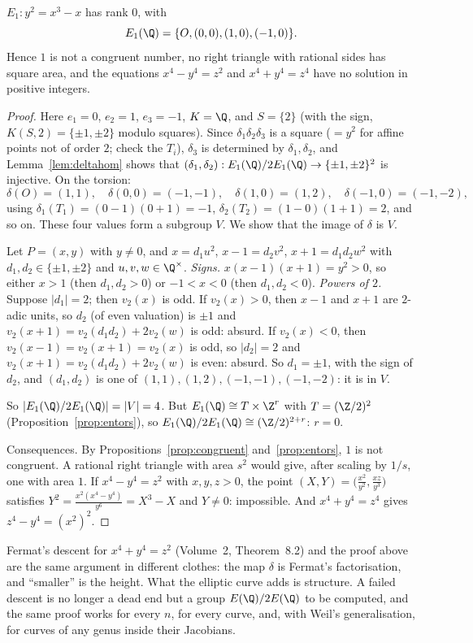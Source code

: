 \begin{theorem}[Fermat]\label{thm:onecongruent}
$E_1:y^2=x^3-x$ has rank $0$, with
\[
E_1(\Q)=\{O,(0,0),(1,0),(-1,0)\}.
\]
Hence $1$ is not a congruent number, no right triangle with rational sides has square area, and
the equations $x^4-y^4=z^2$ and $x^4+y^4=z^4$ have no solution in positive integers.
\end{theorem}
\begin{proof}
Here $e_1=0$, $e_2=1$, $e_3=-1$, $K=\Q$, and $S=\{2\}$ (with the sign, $K(S,2)=\{\pm1,\pm2\}$ modulo squares). Since $\delta_1\delta_2\delta_3$ is a square
($=y^2$ for affine points not of order $2$; check the $T_i$), $\delta_3$ is determined by $\delta_1,\delta_2$, and Lemma~\ref{lem:deltahom} shows that
$(\delta_1,\delta_2):E_1(\Q)/2E_1(\Q)\to\{\pm1,\pm2\}^2$ is injective. On the torsion:
\[
\delta(O)=(1,1),\quad\delta(0,0)=(-1,-1),\quad\delta(1,0)=(1,2),\quad\delta(-1,0)=(-1,-2),
\]
using $\delta_1(T_1)=(0-1)(0+1)=-1$, $\delta_2(T_2)=(1-0)(1+1)=2$, and so on. These four values form a subgroup $V$. We show that the image of $\delta$ is $V$.

Let $P=(x,y)$ with $y\ne0$, and $x=d_1u^2$, $x-1=d_2v^2$, $x+1=d_1d_2w^2$ with $d_1,d_2\in\{\pm1,\pm2\}$ and $u,v,w\in\Q^\times$. \emph{Signs.} $x(x-1)(x+1)=y^2>0$, so either
$x>1$ (then $d_1,d_2>0$) or $-1<x<0$ (then $d_1,d_2<0$). \emph{Powers of $2$.} Suppose $|d_1|=2$; then $v_2(x)$ is odd. If $v_2(x)>0$, then $x-1$ and $x+1$ are
$2$-adic units, so $d_2$ (of even valuation) is $\pm1$ and $v_2(x+1)=v_2(d_1d_2)+2v_2(w)$ is odd: absurd. If $v_2(x)<0$, then
$v_2(x-1)=v_2(x+1)=v_2(x)$ is odd, so $|d_2|=2$ and $v_2(x+1)=v_2(d_1d_2)+2v_2(w)$ is even: absurd. So $d_1=\pm1$, with the sign of $d_2$, and $(d_1,d_2)$ is
one of $(1,1),(1,2),(-1,-1),(-1,-2)$: it is in $V$.

So $|E_1(\Q)/2E_1(\Q)|=|V|=4$. But $E_1(\Q)\cong T\times\Z^r$ with $T=(\Z/2)^2$ (Proposition~\ref{prop:entors}), so $E_1(\Q)/2E_1(\Q)\cong(\Z/2)^{2+r}$: $r=0$.

Consequences. By Propositions~\ref{prop:congruent} and~\ref{prop:entors}, $1$ is not congruent. A rational right triangle with area $s^2$ would give, after scaling by $1/s$,
one with area $1$. If $x^4-y^4=z^2$ with $x,y,z>0$, the point $(X,Y)=\bigl(\frac{x^2}{y^2},\frac{xz}{y^3}\bigr)$ satisfies $Y^2=\frac{x^2(x^4-y^4)}{y^6}=X^3-X$ and $Y\ne0$:
impossible. And $x^4+y^4=z^4$ gives $z^4-y^4=(x^2)^2$.
\end{proof}

\begin{beauty}
Fermat's descent for $x^4+y^4=z^2$ (Volume~2, Theorem~8.2) and the proof above are the same argument in different clothes: the map $\delta$ is Fermat's factorisation, and
``smaller'' is the height. What the elliptic curve adds is structure. A failed descent is no longer a dead end but a group $E(\Q)/2E(\Q)$ to be computed,
and the same proof works for every $n$, for every curve, and, with Weil's generalisation, for curves of any genus inside their Jacobians.
\end{beauty}

